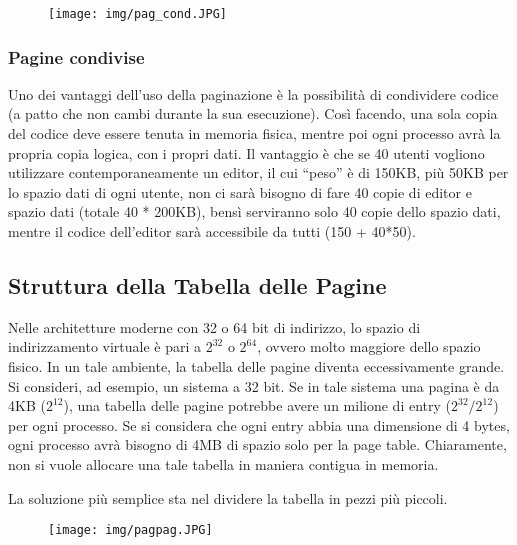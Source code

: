 \documentclass[a4]{article}
\begin{document}
\begin{figure}[h!]
    \centering
    \texttt{[image: img/pag\_cond.JPG]}
\end{figure}

\subsubsection{Pagine condivise}
Uno dei vantaggi dell'uso della paginazione è la possibilità di condividere codice (a patto che non cambi durante la sua esecuzione). Così facendo, una sola copia del codice deve essere tenuta in memoria fisica, mentre poi ogni processo avrà la propria copia logica, con i propri dati. Il vantaggio è che se 40 utenti vogliono utilizzare contemporaneamente un editor, il cui ``peso'' è di 150KB, più 50KB per lo spazio dati di ogni utente, non ci sarà bisogno di fare 40 copie di editor e spazio dati (totale 40 * 200KB), bensì serviranno solo 40 copie dello spazio dati, mentre il codice dell'editor sarà accessibile da tutti (150 + 40*50).

\subsection{Struttura della Tabella delle Pagine}
Nelle architetture moderne con 32 o 64 bit di indirizzo, lo spazio di indirizzamento virtuale è pari a $2^{32}$ o $2^{64}$, ovvero molto maggiore dello spazio fisico. In un tale ambiente, la tabella delle pagine diventa eccessivamente grande. Si consideri, ad esempio, un sistema a 32 bit. Se in tale sistema una pagina è da 4KB ($2^{12}$), una tabella delle pagine potrebbe avere un milione di entry ($2^{32} / 2^{12}$) per ogni processo. Se si considera che ogni entry abbia una dimensione di 4 bytes, ogni processo avrà bisogno di 4MB di spazio solo per la page table. Chiaramente, non si vuole allocare una tale tabella in maniera contigua in memoria.

La soluzione più semplice sta nel dividere la tabella in pezzi più piccoli.

\begin{figure}[h!]
    \centering
    \texttt{[image: img/pagpag.JPG]}
\end{figure}
\end{document}
